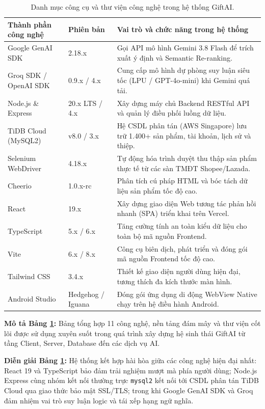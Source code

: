 \begin{table}[htbp]
\centering
\caption{Danh mục công cụ và thư viện công nghệ trong hệ thống GiftAI.}
\label{tab:congcu}
\small
\renewcommand{\arraystretch}{1.2}
\begin{tabularx}{\textwidth}{|p{3.5cm}|p{2.2cm}|X|}
\hline
\textbf{Thành phần công nghệ} & \textbf{Phiên bản} & \textbf{Vai trò và chức năng trong hệ thống} \\
\hline
Google GenAI SDK & 2.18.x & Gọi API mô hình Gemini 3.8 Flash để trích xuất ý định và Semantic Re-ranking. \\
\hline
Groq SDK / OpenAI SDK & 0.9.x / 4.x & Cung cấp mô hình dự phòng suy luận siêu tốc (LPU / GPT-4o-mini) khi Gemini quá tải. \\
\hline
Node.js \& Express & 20.x LTS / 4.x & Xây dựng máy chủ Backend RESTful API và quản lý điều phối luồng dữ liệu. \\
\hline
TiDB Cloud (MySQL2) & v8.0 / 3.x & Hệ CSDL phân tán (AWS Singapore) lưu trữ 1.400+ sản phẩm, tài khoản, lịch sử và thiệp. \\
\hline
Selenium WebDriver & 4.18.x & Tự động hóa trình duyệt thu thập sản phẩm thực tế từ các sàn TMĐT Shopee/Lazada. \\
\hline
Cheerio & 1.0.x-rc & Phân tích cú pháp HTML và bóc tách dữ liệu sản phẩm tốc độ cao. \\
\hline
React & 19.x & Xây dựng giao diện Web tương tác phản hồi nhanh (SPA) triển khai trên Vercel. \\
\hline
TypeScript & 5.x / 6.x & Tăng cường tính an toàn kiểu dữ liệu cho toàn bộ mã nguồn Frontend. \\
\hline
Vite & 6.x / 8.x & Công cụ biên dịch, phát triển và đóng gói mã nguồn Frontend tốc độ cao. \\
\hline
Tailwind CSS & 3.4.x & Thiết kế giao diện người dùng hiện đại, tương thích đa kích thước màn hình. \\
\hline
Android Studio & Hedgehog / Iguana & Đóng gói ứng dụng di động WebView Native chạy trên hệ điều hành Android. \\
\hline
\end{tabularx}
\end{table}

\noindent \textbf{Mô tả Bảng \ref{tab:congcu}:} Bảng tổng hợp 11 công nghệ, nền tảng đám mây và thư viện cốt lõi được sử dụng xuyên suốt trong quá trình xây dựng hệ sinh thái GiftAI từ tầng Client, Server, Database đến các dịch vụ AI.

\noindent \textbf{Diễn giải Bảng \ref{tab:congcu}:} Hệ thống kết hợp hài hòa giữa các công nghệ hiện đại nhất: React 19 và TypeScript bảo đảm trải nghiệm mượt mà phía người dùng; Node.js Express cùng nhóm kết nối thường trực \texttt{mysql2} kết nối tới CSDL phân tán TiDB Cloud qua giao thức bảo mật SSL/TLS; trong khi Google GenAI SDK và Groq đảm nhiệm vai trò suy luận logic và tái xếp hạng ngữ nghĩa.

